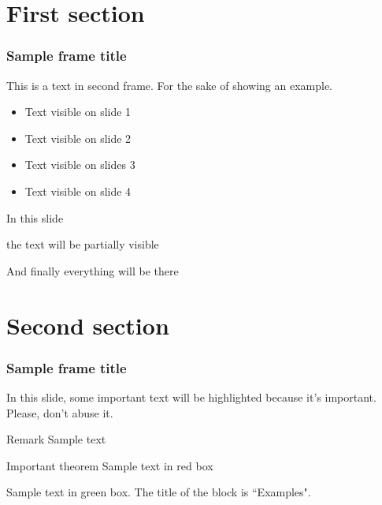    \section{First section}

    \begin{frame}
    \frametitle{Sample frame title}
    This is a text in second frame. For the sake of showing an example.
    
    \begin{itemize}
        \item<1-> Text visible on slide 1
        \item<2-> Text visible on slide 2
        \item<3> Text visible on slides 3
        \item<4-> Text visible on slide 4
    \end{itemize}
    \end{frame}
    
    
    
    \begin{frame}
    In this slide \pause
    
    the text will be partially visible \pause
    
    And finally everything will be there
    \end{frame}
    
    \section{Second section}
    
    \begin{frame}
    \frametitle{Sample frame title}
    
    In this slide, some important text will be
    \alert{highlighted} because it's important.
    Please, don't abuse it.
    
    \begin{block}{Remark}
    Sample text
    \end{block}
    
    \begin{alertblock}{Important theorem}
    Sample text in red box
    \end{alertblock}
    
    \begin{examples}
    Sample text in green box. The title of the block is ``Examples".
    \end{examples}
    \end{frame}
    
